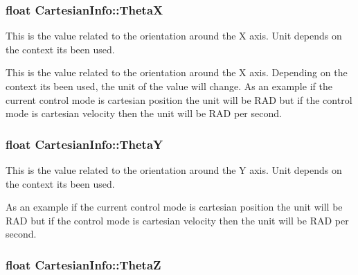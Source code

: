 \subsubsection[{\texorpdfstring{ThetaX}{ThetaX}}]{\setlength{\rightskip}{0pt plus 5cm}float Cartesian\+Info\+::\+ThetaX\hspace{0.3cm}{\ttfamily [inherited]}}\hypertarget{structCartesianInfo_a39135e53155aa4025c40eeefbfd3b17c}{}\label{structCartesianInfo_a39135e53155aa4025c40eeefbfd3b17c}


This is the value related to the orientation around the X axis. Unit depends on the context it\textquotesingle{}s been used. 

This is the value related to the orientation around the X axis. Depending on the context it\textquotesingle{}s been used, the unit of the value will change. As an example if the current control mode is cartesian position the unit will be R\+AD but if the control mode is cartesian velocity then the unit will be R\+AD per second. 
\subsubsection[{\texorpdfstring{ThetaY}{ThetaY}}]{\setlength{\rightskip}{0pt plus 5cm}float Cartesian\+Info\+::\+ThetaY\hspace{0.3cm}{\ttfamily [inherited]}}\hypertarget{structCartesianInfo_a4aef5897f4cdcf7ecc9df6804f844d46}{}\label{structCartesianInfo_a4aef5897f4cdcf7ecc9df6804f844d46}


This is the value related to the orientation around the Y axis. Unit depends on the context it\textquotesingle{}s been used. 

As an example if the current control mode is cartesian position the unit will be R\+AD but if the control mode is cartesian velocity then the unit will be R\+AD per second. 
\subsubsection[{\texorpdfstring{ThetaZ}{ThetaZ}}]{\setlength{\rightskip}{0pt plus 5cm}float Cartesian\+Info\+::\+ThetaZ\hspace{0.3cm}{\ttfamily [inherited]}}\hypertarget{structCartesianInfo_a2890c501f3b7b9479e12ad51f04f0a7f}{}\label{structCartesianInfo_a2890c501f3b7b9479e12ad51f04f0a7f}


